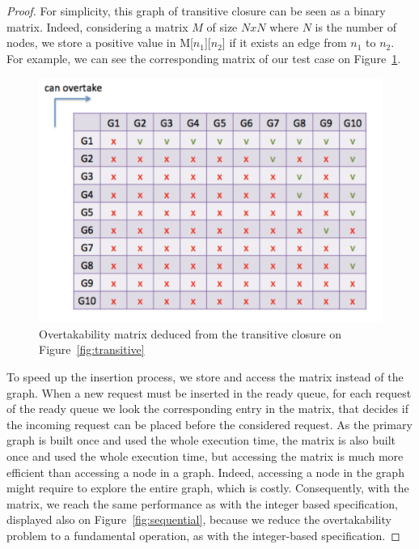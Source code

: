 \documentclass[11pt]{report}
\begin{document}
\begin{proof}
For simplicity, this graph of transitive closure can be seen as a binary matrix. Indeed, considering a matrix $M$ of size $NxN$ where $N$ is the number of nodes, we store a positive value in M[$n_1$][$n_2$] if it exists an edge from $n_1$ to $n_2$. For example, we can see the corresponding matrix of our test case on Figure~\ref{fig:matrix}.
\begin{figure}[!ht]
      \begin{minipage}[c]{\textwidth}
      \centering
      \includegraphics[scale=0.5]{pictures/matrix.pdf}
      \end{minipage}
      \caption{Overtakability matrix deduced from the transitive closure on Figure~\ref{fig:transitive}}
      \label{fig:matrix} 
\end{figure}
To speed up the insertion process, we store and access the matrix instead of the graph. When a new request must be inserted in the ready queue, for each request of the ready queue we look the corresponding entry in the matrix, that decides if the incoming request can be placed before the considered request. 
As the primary graph is built once and used the whole execution time, the matrix is also built once and used the whole execution time, but accessing the matrix is much more efficient than accessing a node in a graph. Indeed, accessing a node in the graph might require to explore the entire graph, which is costly.
Consequently, with the matrix, we reach the same performance as with the integer based specification, displayed also on Figure~\ref{fig:sequential}, because we reduce the overtakability problem to a fundamental operation, as with the integer-based specification.


\end{proof}
\end{document}
